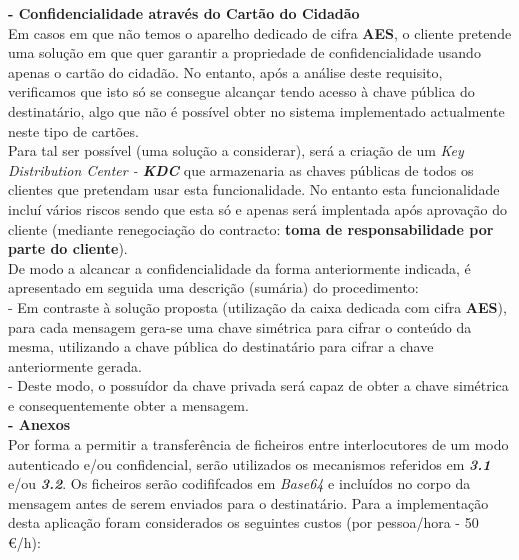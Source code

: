\documentclass[times, 10pt,twocolumn]{article}
\begin{document}
\noindent \textbf{- Confidencialidade atrav\'es do Cart\~ao do Cidad\~ao}\\
\indent Em casos em que n\~ao temos o aparelho dedicado de cifra \textbf{AES}, o cliente pretende uma solu\c{c}\~ao em que quer garantir a propriedade de confidencialidade usando apenas o cart\~ao do cidad\~ao. No entanto, ap\'os a an\'alise deste requisito, verificamos que isto s\'o se consegue alcan\c{c}ar tendo acesso \`a chave p\'ublica do destinat\'ario, algo que n\~ao \'e poss\'ivel obter no sistema implementado actualmente neste tipo de cart\~oes.\\
\indent Para tal ser poss\'ivel (uma solu\c{c}\~ao a considerar), ser\'a a cria\c{c}\~ao de um \emph{Key Distribution Center - \textbf{KDC}} que armazenaria as chaves p\'ublicas de todos os clientes que pretendam usar esta funcionalidade. No entanto esta funcionalidade inclu\'i v\'arios riscos sendo que esta s\'o e apenas ser\'a implentada ap\'os aprova\c{c}\~ao do cliente (mediante renegocia\c{c}\~ao do contracto: \textbf{toma de responsabilidade por parte do cliente}).\\
\indent De modo a alcancar a confidencialidade da forma anteriormente indicada, \'e apresentado em seguida uma descri\c{c}\~ao (sum\'aria) do procedimento:\\
\indent \indent - Em contraste \`a solu\c{c}\~ao proposta (utiliza\c{c}\~ao da caixa dedicada com cifra \textbf{AES}), para cada mensagem gera-se uma chave sim\'etrica para cifrar o conte\'udo da mesma, utilizando a chave p\'ublica do destinat\'ario para cifrar a chave anteriormente gerada.\\
\indent \indent - Deste modo, o possu\'idor da chave privada ser\'a capaz de obter a chave sim\'etrica e consequentemente obter a mensagem.\\

\noindent \textbf{- Anexos}\\
\indent Por forma a permitir a transfer\^encia de ficheiros entre interlocutores de um modo autenticado e/ou confidencial, ser\~ao utilizados os mecanismos referidos em \emph{\textbf{3.1}} e/ou \emph{\textbf{3.2}}. Os ficheiros ser\~ao codififcados em \emph{Base64} e inclu\'idos no corpo da mensagem antes de serem enviados para o destinat\'ario.
Para a implementa\c{c}\~ao desta aplica\c{c}\~ao foram considerados os seguintes custos (por pessoa/hora - 50 \euro /h):\\
\end{document}
